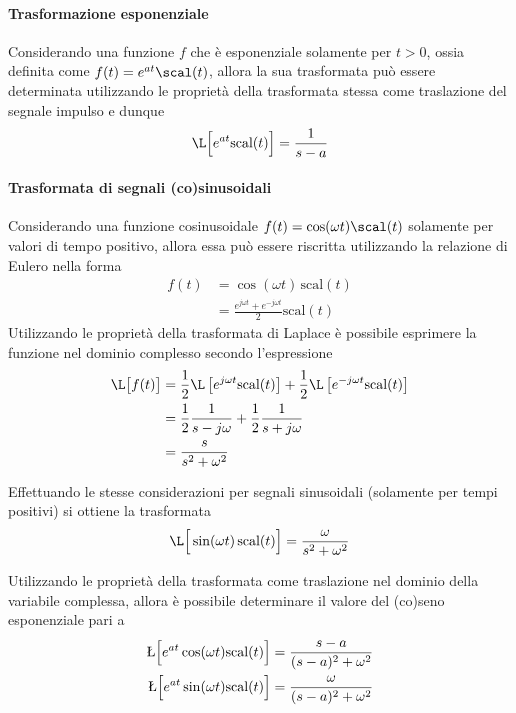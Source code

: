 	\begin{multicols}{2}	
		\paragraph{Trasformazione esponenziale} Considerando una funzione $f$ che è esponenziale solamente per $t>0$, ossia definita come $f(t) = e^{at} \scal(t)$, allora la sua trasformata può essere determinata utilizzando le proprietà della trasformata stessa come traslazione del segnale impulso e dunque 
		\[ \L \Big[e^{at} \textrm{scal}(t)\Big] = \frac{1}{s-a}\]
		
		\paragraph{Trasformata di segnali (co)sinusoidali} Considerando una funzione cosinusoidale $f(t) = \cos(\omega t) \scal(t)$ solamente per valori di tempo positivo, allora essa può essere riscritta utilizzando la relazione di Eulero nella forma
		\begin{align*}
			f(t) & = \cos(\omega t) \, \textrm{scal}(t)\\ 
			& = \frac{e^{j\omega t} + e^{-j\omega t}}{2} \textrm{scal}(t)
		\end{align*}
		Utilizzando le proprietà della trasformata di Laplace è possibile esprimere la funzione nel dominio complesso secondo l'espressione
		\begin{align*}
		\L\big[f(t)\big] & = \frac 1 2 \L \left[e^{j\omega t} \textrm{scal}(t)\right] + \frac 1 2 \L \left[e^{-j\omega t} \textrm{scal}(t)\right] 	\\ & = \frac 1 2 \frac{1}{s-j\omega}  + \frac 1 2 \frac{1}{s+j\omega} \\
		& = \frac{s}{s^2+\omega^2}
		\end{align*}  
	
		Effettuando le stesse considerazioni per segnali sinusoidali (solamente per tempi positivi) si ottiene la trasformata
		\begin{equation}
			\L\Big[\sin(\omega t) \, \textrm{scal}(t)\Big] = \frac{\omega}{s^2+\omega^2}
		\end{equation}
	
		Utilizzando le proprietà della trasformata come traslazione nel dominio della variabile complessa, allora è possibile determinare il valore del (co)seno esponenziale pari a
		\begin{align*}
			\L \Big[e^{at} \cos(\omega t) \textrm{scal}(t)\Big] & = \frac{s-a}{(s-a)^2+\omega^2} \\  \L \Big[e^{at} \sin(\omega t) \textrm{scal}(t)\Big] & = \frac{\omega}{(s-a)^2+\omega^2} 
		\end{align*}
		

\end{multicols}
